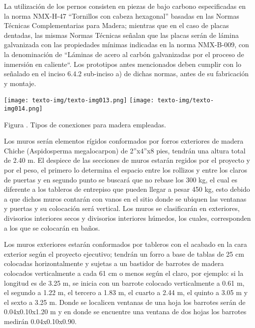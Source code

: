 \documentclass{article}
\newcounter{Figura}
\renewcommand\theFigura{\arabic{Figura}}
\begin{document}
La utilización de los pernos consisten en piezas de bajo carbono especificadas en la norma NMX-H-47 “Tornillos con cabeza hexagonal” basadas en las Normas Técnicas Complementarias para Madera; mientras que en el caso de placas dentadas, las mismas Normas Técnicas señalan que las placas serán de lámina galvanizada con las propiedades mínimas indicadas en la norma NMX-B-009, con la denominación de “Láminas de acero al carbón galvanizadas por el proceso de inmersión en caliente“. Los prototipos antes mencionados deben cumplir con lo señalado en el inciso 6.4.2 sub-inciso a) de dichas normas, antes de su fabricación y montaje.


\bigskip

 \texttt{[image: texto-img/texto-img013.png]}   \texttt{[image: texto-img/texto-img014.png]} 

Figura \stepcounter{Figura}{\theFigura}. Tipos de conexiones para madera empleadas.


\bigskip


\bigskip

Los muros serán elementos rígidos conformados por forros exteriores de madera Chiche (Aspidosperma megalocarpon) de 2”x4”x8 pies, tendrán una altura total de 2.40 m. El despiece de las secciones de muros estarán regidos por el proyecto y por el peso, el primero lo determina el espacio entre los rollizos y entre los claros de puertas y en segundo punto se buscará que no rebase los 300 kg, el cual es diferente a los tableros de entrepiso que pueden llegar a pesar 450 kg, esto debido a que dichos muros contarán con vanos en el sitio donde se ubiquen las ventanas y puertas y su colocación será vertical. Los muros se clasificarán en exteriores, divisorios interiores secos y divisorios interiores húmedos, los cuales, corresponden a los que se colocarán en baños.


\bigskip

Los muros exteriores estarán conformados por tableros con el acabado en la cara exterior según el proyecto ejecutivo; tendrán un forro a base de tablas de 25 cm colocadas horizontalmente y sujetas a un bastidor de barrotes de madera colocados verticalmente a cada 61 cm o menos según el claro, por ejemplo: si la longitud es de 3.25 m, se inicia con un barrote colocado verticalmente a 0.61 m, el segundo a 1.22 m, el tercero a 1.83 m, el cuarto a 2.44 m, el quinto a 3.05 m y el sexto a 3.25 m. Donde se localicen ventanas de una hoja los barrotes serán de 0.04x0.10x1.20 m y en donde se encuentre una ventana de dos hojas los barrotes medirán 0.04x0.10x0.90.
\end{document}
